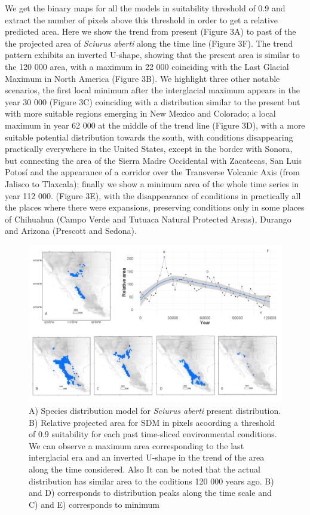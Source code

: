 \documentclass[
]{article}
\begin{document}
We get the binary maps for all the models in suitability threshold of
0.9 and extract the number of pixels above this threshold in order to
get a relative predicted area. Here we show the trend from present
(Figure 3A) to past of the the projected area of \emph{Sciurus aberti}
along the time line (Figure 3F). The trend pattern exhibits an inverted
U-shape, showing that the present area is similar to the 120 000 area,
with a maximum in 22 000 coinciding with the Last Glacial Maximum in
North America (Figure 3B). We highlight three other notable scenarios,
the first local minimum after the interglacial maximum appears in the
year 30 000 (Figure 3C) coinciding with a distribution similar to the
present but with more suitable regions emerging in New Mexico and
Colorado; a local maximum in year 62 000 at the middle of the trend line
(Figure 3D), with a more suitable potential distribution towards the
south, with conditions disappearing practically everywhere in the United
States, except in the border with Sonora, but connecting the area of the
Sierra Madre Occidental with Zacatecas, San Luis Potosí and the
appearance of a corridor over the Transverse Volcanic Axis (from Jalisco
to Tlaxcala); finally we show a minimum area of the whole time series in
year 112 000. (Figure 3E), with the disappearance of conditions in
practically all the places where there were expansions, preserving
conditions only in some places of Chihuahua (Campo Verde and Tutuaca
Natural Protected Areas), Durango and Arizona (Prescott and Sedona).

\begin{figure}
\centering
\includegraphics[width=1\textwidth,height=\textheight]{all_figures/figure_3.png}
\caption{A) Species distribution model for \emph{Sciurus aberti} present
distribution. B) Relative projected area for SDM in pixels acoording a
threshold of 0.9 suitability for each past time-sliced environmental
conditions. We can observe a maximum area corresponding to the last
interglacial era and an inverted U-shape in the trend of the area along
the time considered. Also It can be noted that the actual distribution
has similar area to the coditions 120 000 years ago. B) and D)
corresponds to distribution peaks along the time scale and C) and E)
corresponds to minimum}
\end{figure}
\end{document}
